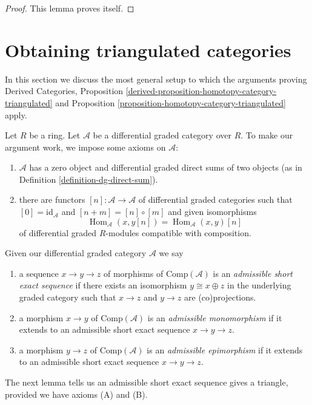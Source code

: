\documentclass{stacks-project}
\theoremstyle{plain}
\theoremstyle{definition}
\theoremstyle{remark}
\numberwithin{equation}{subsection}
\def\Hom{\mathop{\mathrm{Hom}}\nolimits}
\begin{document}
\begin{proof}
This lemma proves itself.
\end{proof}









\section{Obtaining triangulated categories}
\label{section-review}

\noindent
In this section we discuss the most general setup to which the arguments
proving Derived Categories, Proposition
\ref{derived-proposition-homotopy-category-triangulated} and
Proposition \ref{proposition-homotopy-category-triangulated} apply.

\medskip\noindent
Let $R$ be a ring. Let $\mathcal{A}$ be a differential graded category
over $R$. To make our argument work, we impose some axioms on $\mathcal{A}$:
\begin{enumerate}
\item[(A)] $\mathcal{A}$ has a zero object and differential
graded direct sums of two objects
(as in Definition \ref{definition-dg-direct-sum}).
\item[(B)] there are functors $[n] : \mathcal{A} \longrightarrow \mathcal{A}$
of differential graded categories such that
$[0] = \text{id}_\mathcal{A}$ and $[n + m] = [n] \circ [m]$
and given isomorphisms
$$
\Hom_\mathcal{A}(x, y[n]) = \Hom_\mathcal{A}(x, y)[n]
$$
of differential graded $R$-modules compatible with composition.
\end{enumerate}

\noindent
Given our differential graded category $\mathcal{A}$ we say
\begin{enumerate}
\item a sequence $x \to y \to z$ of morphisms of $\text{Comp}(\mathcal{A})$
is an {\it admissible short exact sequence} if there exists
an isomorphism $y \cong x \oplus z$ in the underlying graded category
such that $x \to z$ and $y \to z$ are (co)projections.
\item a morphism $x\to y$ of $\text{Comp}(\mathcal{A})$ is an
{\it admissible monomorphism} if it extends to an
admissible short exact sequence $x\to y\to z$.
\item a morphism $y\to z$ of $\text{Comp}(\mathcal{A})$ is an
{\it admissible epimorphism} if it extends to an
admissible short exact sequence $x\to y\to z$.
\end{enumerate}
The next lemma tells us an admissible short exact sequence gives a
triangle, provided we have axioms (A) and (B).
\end{document}
